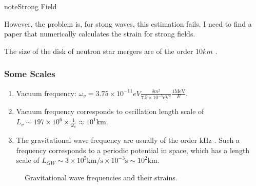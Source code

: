 \documentclass[letterpaper,12pt,english]{sphinxmanual}
\begin{document}
\begin{sphinxadmonition}{note}{Strong Field}

However, the problem is, for stong waves, this estimation fails. I need to find a paper that numerically calculates the strain for strong fields.

\end{sphinxadmonition}

The size of the disk of neutron star mergers are of the order \(10 km\) \label{\detokenize{gravity/gravitational-waves:id5}}{\hyperref[\detokenize{gravity/gravitational-waves:foucart2012}]{\sphinxcrossref{{[}Foucart2012{]}}}}.


\subsubsection{Some Scales}
\label{\detokenize{gravity/gravitational-waves:some-scales}}\begin{enumerate}
\item {} 
Vacuum frequency: \(\omega_v = 3.75\times 10^{-11}eV \frac{ \delta m^2 }{ 7.5\times 10^{-5} \mathrm{eV^2} } \frac{1\mathrm{MeV} }{E}\).

\item {} 
Vacuum frequency corresponds to oscillation length scale of \(L_v \sim 197\times 10^6\times \frac{ 1 }{ \omega_v } \approx 10^1 \mathrm{km}\).

\item {} 
The gravitational wave frequency are usually of the order kHz \label{\detokenize{gravity/gravitational-waves:id6}}{\hyperref[\detokenize{gravity/gravitational-waves:bauswein2016}]{\sphinxcrossref{{[}Bauswein2016{]}}}}. Such a frequency corresponds to a periodic potential in space, which has a length scale of \(L_{GW} \sim 3\times 10^{5}\mathrm{km/s} \times 10^{-3} \mathrm{s}\sim 10^2 \mathrm{km}\).

\end{enumerate}
\begin{figure}[htbp]
\centering
\capstart

\noindent{}
\caption{Gravitational wave frequencies and their strains. \label{\detokenize{gravity/gravitational-waves:id7}}{\hyperref[\detokenize{gravity/gravitational-waves:bauswein2016}]{\sphinxcrossref{{[}Bauswein2016{]}}}}}\label{\detokenize{gravity/gravitational-waves:id12}}\end{figure}
\end{document}
